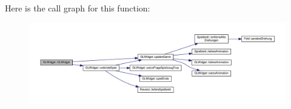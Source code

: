 Here is the call graph for this function\-:\nopagebreak
\begin{figure}[H]
\begin{center}
\leavevmode
\includegraphics[width=350pt]{classGLWidget_ab79c391c86de1ffb76f6950b49d82c0c_cgraph}
\end{center}
\end{figure}




